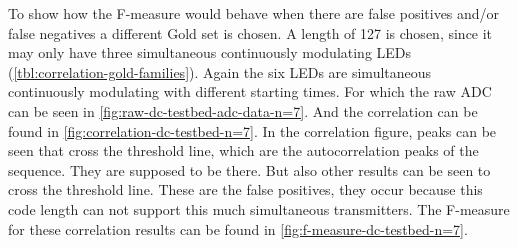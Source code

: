 To show how the F-measure would behave when there are false positives and/or false negatives a different Gold set is chosen.
A length of 127 is chosen, since it may only have three simultaneous continuously modulating LEDs (\autoref{tbl:correlation-gold-families}).
Again the six LEDs are simultaneous continuously modulating with different starting times.
For which the raw ADC can be seen in \autoref{fig:raw-dc-testbed-adc-data-n=7}.
And the correlation can be found in \autoref{fig:correlation-dc-testbed-n=7}.
In the correlation figure, peaks can be seen that cross the threshold line, which are the autocorrelation peaks of the sequence.
They are supposed to be there.
But also other results can be seen to cross the threshold line.
These are the false positives, they occur because this code length can not support this much simultaneous transmitters.
The F-measure for these correlation results can be found in \autoref{fig:f-measure-dc-testbed-n=7}.



